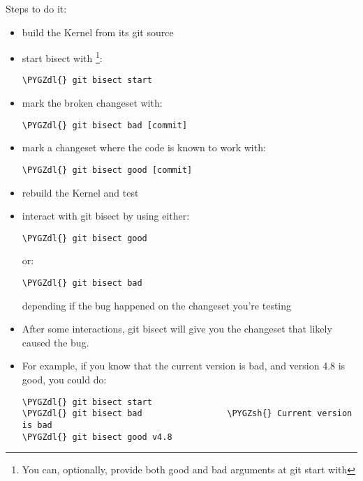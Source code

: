 \documentclass[a4paper,8pt,english]{sphinxmanual}
\def\PYGZsh{\char`\#}
\def\PYGZdl{\char`\$}
\begin{document}
Steps to do it:
\begin{itemize}
\item {} 
build the Kernel from its git source

\item {} 
start bisect with \footnote[1]{
You can, optionally, provide both good and bad arguments at git
start with 
}:

\begin{Verbatim}[commandchars=\\\{\}]
\PYGZdl{} git bisect start
\end{Verbatim}

\item {} 
mark the broken changeset with:

\begin{Verbatim}[commandchars=\\\{\}]
\PYGZdl{} git bisect bad [commit]
\end{Verbatim}

\item {} 
mark a changeset where the code is known to work with:

\begin{Verbatim}[commandchars=\\\{\}]
\PYGZdl{} git bisect good [commit]
\end{Verbatim}

\item {} 
rebuild the Kernel and test

\item {} 
interact with git bisect by using either:

\begin{Verbatim}[commandchars=\\\{\}]
\PYGZdl{} git bisect good
\end{Verbatim}

or:

\begin{Verbatim}[commandchars=\\\{\}]
\PYGZdl{} git bisect bad
\end{Verbatim}

depending if the bug happened on the changeset you're testing

\item {} 
After some interactions, git bisect will give you the changeset that
likely caused the bug.

\item {} 
For example, if you know that the current version is bad, and version
4.8 is good, you could do:

\begin{Verbatim}[commandchars=\\\{\}]
\PYGZdl{} git bisect start
\PYGZdl{} git bisect bad                 \PYGZsh{} Current version is bad
\PYGZdl{} git bisect good v4.8
\end{Verbatim}

\end{itemize}
\end{document}
